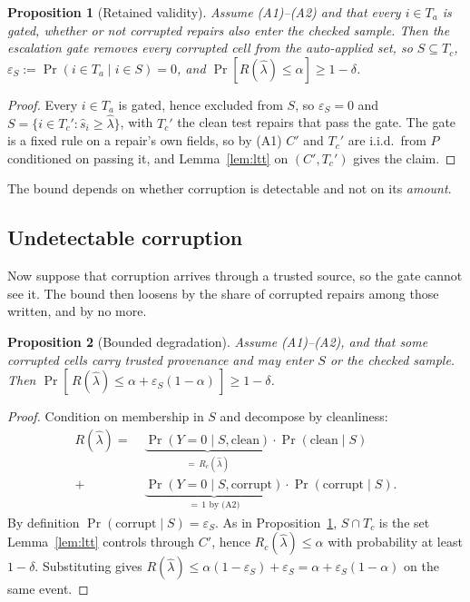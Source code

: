 \documentclass[sigconf, nonacm, balance=false]{acmart}
\newtheorem{proposition}{Proposition}
\theoremstyle{remark}
\begin{document}
\begin{proposition}[Retained validity]
\label{thm:1}
Assume (A1)--(A2) and that every $i\in T_a$ is gated, whether or not corrupted repairs
also enter the checked sample. Then the escalation gate removes every corrupted cell
from the auto-applied set, so
$S\subseteq T_c$, $\varepsilon_S:=\Pr(i\in T_a\mid i\in S)=0$, and
$\Pr[R(\hat\lambda)\le\alpha]\ge1-\delta$.
\end{proposition}

\begin{proof}
Every $i\in T_a$ is gated, hence excluded from $S$, so $\varepsilon_S=0$ and
$S=\{i\in T_c':\hat s_i\ge\hat\lambda\}$, with $T_c'$ the clean test repairs that pass
the gate. The gate is a fixed rule on a repair's own fields, so by (A1) $C'$ and $T_c'$
are i.i.d.\ from $P$ conditioned on passing it, and Lemma~\ref{lem:ltt} on $(C',T_c')$
gives the claim.
\end{proof}

The bound depends on whether corruption is detectable and not on its \emph{amount}.

\subsection{Undetectable corruption}
Now suppose that corruption arrives through a trusted source, so the gate cannot see
it. The bound then loosens by the share of corrupted repairs among those written, and by
no more.

\begin{proposition}[Bounded degradation]
\label{thm:2}
Assume (A1)--(A2), and that some corrupted cells carry trusted provenance and may
enter $S$ or the checked sample. Then
$\Pr[\,R(\hat\lambda)\le\alpha+\varepsilon_S(1-\alpha)\,]\ge1-\delta$.
\end{proposition}

\begin{proof}
Condition on membership in $S$ and decompose by cleanliness:
\begin{align*}
R(\hat\lambda)=\;&\underbrace{\Pr(Y{=}0\mid S,\text{clean})}_{=\,R_c(\hat\lambda)}
  \cdot\Pr(\text{clean}\mid S)\\
+\;&\underbrace{\Pr(Y{=}0\mid S,\text{corrupt})}_{=\,1\text{ by (A2)}}
  \cdot\Pr(\text{corrupt}\mid S).
\end{align*}
By definition $\Pr(\text{corrupt}\mid S)=\varepsilon_S$. As in Proposition~\ref{thm:1},
$S\cap T_c$ is the set Lemma~\ref{lem:ltt} controls through $C'$, hence $R_c(\hat\lambda)\le\alpha$ with probability at least $1-\delta$.
Substituting gives $R(\hat\lambda)\le\alpha(1-\varepsilon_S)+\varepsilon_S
=\alpha+\varepsilon_S(1-\alpha)$ on the same event.
\end{proof}
\end{document}
